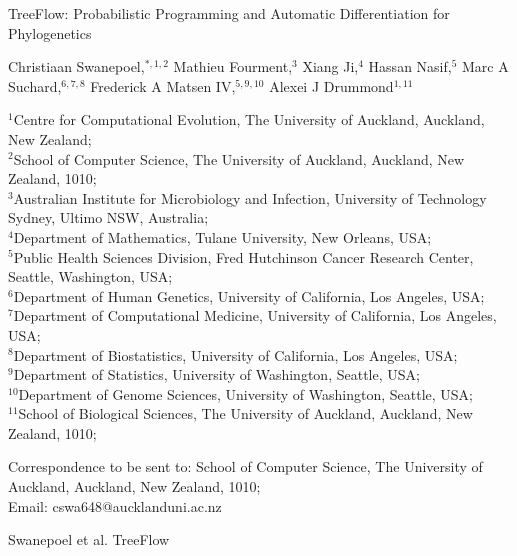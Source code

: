 
TreeFlow: Probabilistic Programming and Automatic Differentiation for Phylogenetics

Christiaan Swanepoel,$^{\ast, 1, 2}$
Mathieu Fourment,$^{3}$
Xiang Ji,$^{4}$
Hassan Nasif,$^{5}$
Marc A Suchard,$^{6,7,8}$
Frederick A Matsen IV,$^{5,9,10}$
Alexei J Drummond$^{1,11}$

${^1}$Centre for Computational Evolution, The University of Auckland, Auckland, New Zealand;\\
$^{2}$School of Computer Science, The University of Auckland, Auckland, New Zealand, 1010;\\
$^{3}$Australian Institute for Microbiology and Infection, University of Technology Sydney, Ultimo NSW, Australia;\\
$^{4}$Department of Mathematics, Tulane University, New Orleans, USA;\\
$^{5}$Public Health Sciences Division, Fred Hutchinson Cancer Research Center, Seattle, Washington, USA;\\
$^{6}$Department of Human Genetics, University of California, Los Angeles, USA;\\
$^{7}$Department of Computational Medicine, University of California, Los Angeles, USA;\\
$^{8}$Department of Biostatistics, University of California, Los Angeles, USA;\\
$^{9}$Department of Statistics, University of Washington, Seattle, USA;\\
$^{10}$Department of Genome Sciences, University of Washington, Seattle, USA;\\
$^{11}$School of Biological Sciences, The University of Auckland, Auckland, New Zealand, 1010;\\

Correspondence to be sent to: School of Computer Science, The University of Auckland, Auckland, New Zealand, 1010;\\
Email: cswa648@aucklanduni.ac.nz

Swanepoel et al.
TreeFlow

\usepackage{booktabs}
\usepackage[,outputdir=,cachedir=]{minted}
\usepackage{multirow}
\usepackage{setspace}
\usepackage[T1]{fontenc}
\setcounter{secnumdepth}{0}

